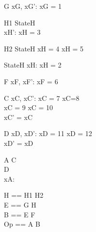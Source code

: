 \begin{schema}{G}
xG, xG': \nat
\where
xG = 1
\end{schema}


\begin{schema}{H1}
StateH \\
xH': \nat
\where
xH = 3
\end{schema}


\begin{schema}{H2}
\Delta StateH
\where
xH = 4 \lor xH = 5
\end{schema}


\begin{schema}{StateH}
xH: \nat
\where
xH = 2
\end{schema}



\begin{schema}{F}
xF, xF': \nat
\where
xF = 6
\end{schema}


\begin{schema}{C}
xC, xC': \nat
\where
xC = 7 \lor xC=8 \\
xC = 9 \implies xC = 10 \\
xC' = xC
\end{schema}


\begin{schema}{D}
xD, xD': \nat
\where
xD = 11 \iff xD = 12 \\
xD' = xD
\end{schema}


\begin{schema}{A}
C \\
D \\
xA: \nat
\end{schema}


\begin{zed}
H == H1 \lor H2 \\
E == G \land H \\
B == E \lor F \\
Op == A \lor B
\end{zed}

